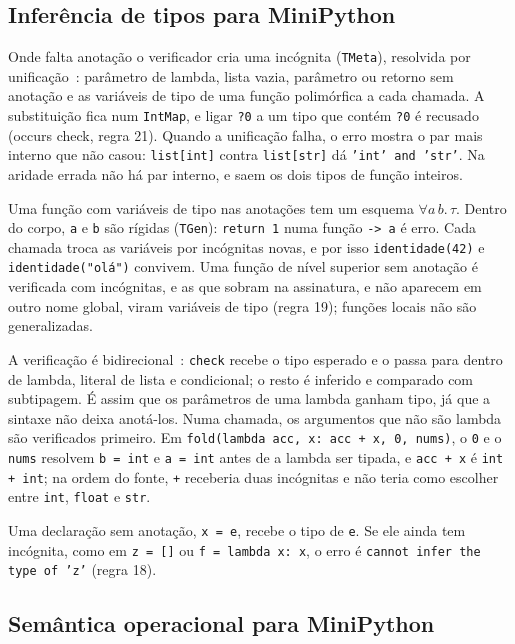 \documentclass[12pt,a4paper]{article}
\begin{document}
\subsection{Inferência de tipos para MiniPython}

Onde falta anotação o verificador cria uma incógnita (\texttt{TMeta}),
resolvida por unificação~\cite{damas1982}: parâmetro de lambda, lista
vazia, parâmetro ou retorno sem anotação e as variáveis de tipo de uma
função polimórfica a cada chamada. A substituição fica num
\texttt{IntMap}, e ligar \texttt{?0} a um tipo que contém \texttt{?0}
é recusado (occurs check, regra 21). Quando a unificação falha, o erro
mostra o par mais interno que não casou: \texttt{list[int]} contra
\texttt{list[str]} dá \texttt{'int' and 'str'}. Na aridade errada não
há par interno, e saem os dois tipos de função inteiros.

Uma função com variáveis de tipo nas anotações tem um esquema
$\forall a\,b.\,\tau$. Dentro do corpo, \texttt{a} e \texttt{b} são
rígidas (\texttt{TGen}): \texttt{return 1} numa função
\texttt{-> a} é erro. Cada chamada troca as variáveis por incógnitas
novas, e por isso \texttt{identidade(42)} e
\texttt{identidade("olá")} convivem. Uma função de nível superior sem
anotação é verificada com incógnitas, e as que sobram na assinatura, e
não aparecem em outro nome global, viram variáveis de tipo (regra 19);
funções locais não são generalizadas.

A verificação é bidirecional~\cite{dunfield2021}: \texttt{check}
recebe o tipo esperado e o passa para dentro de lambda, literal de lista
e condicional; o resto é inferido e comparado com subtipagem. É assim
que os parâmetros de uma lambda ganham tipo, já que a sintaxe não deixa
anotá-los. Numa chamada, os argumentos que não são lambda são
verificados primeiro. Em \texttt{fold(lambda acc, x: acc + x, 0, nums)},
o \texttt{0} e o \texttt{nums} resolvem \texttt{b = int} e
\texttt{a = int} antes de a lambda ser tipada, e \texttt{acc + x} é
\texttt{int + int}; na ordem do fonte, \texttt{+} receberia duas
incógnitas e não teria como escolher entre \texttt{int}, \texttt{float}
e \texttt{str}.

Uma declaração sem anotação, \texttt{x = e}, recebe o tipo de
\texttt{e}. Se ele ainda tem incógnita, como em \texttt{z = []} ou
\texttt{f = lambda x: x}, o erro é \texttt{cannot infer the type of
'z'} (regra 18).

\subsection{Semântica operacional para MiniPython}
\end{document}
